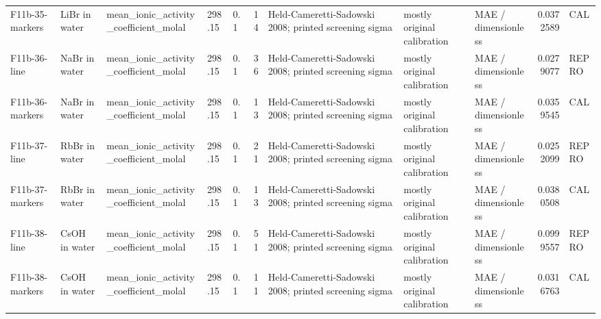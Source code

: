 \begin{landscape}
\begin{longtable}{L{1.9cm}L{2.5cm}L{2.1cm}L{1.6cm}L{1.6cm}rL{2.4cm}L{1.9cm}L{2.2cm}rL{1cm}}
F11b-\allowbreak{}35-\allowbreak{}markers & LiBr in water & mean\_\allowbreak{}ionic\_\allowbreak{}activity\_\allowbreak{}coefficient\_\allowbreak{}molal & 298.15 & 0.1 & 14 & Held-\allowbreak{}Cameretti-\allowbreak{}Sadowski 2008; printed screening sigma & mostly original calibration & MAE /\allowbreak{} dimensionless & 0.0372589 & CAL \\
F11b-\allowbreak{}36-\allowbreak{}line & NaBr in water & mean\_\allowbreak{}ionic\_\allowbreak{}activity\_\allowbreak{}coefficient\_\allowbreak{}molal & 298.15 & 0.1 & 36 & Held-\allowbreak{}Cameretti-\allowbreak{}Sadowski 2008; printed screening sigma & mostly original calibration & MAE /\allowbreak{} dimensionless & 0.0279077 & REPRO \\
F11b-\allowbreak{}36-\allowbreak{}markers & NaBr in water & mean\_\allowbreak{}ionic\_\allowbreak{}activity\_\allowbreak{}coefficient\_\allowbreak{}molal & 298.15 & 0.1 & 13 & Held-\allowbreak{}Cameretti-\allowbreak{}Sadowski 2008; printed screening sigma & mostly original calibration & MAE /\allowbreak{} dimensionless & 0.0359545 & CAL \\
F11b-\allowbreak{}37-\allowbreak{}line & RbBr in water & mean\_\allowbreak{}ionic\_\allowbreak{}activity\_\allowbreak{}coefficient\_\allowbreak{}molal & 298.15 & 0.1 & 21 & Held-\allowbreak{}Cameretti-\allowbreak{}Sadowski 2008; printed screening sigma & mostly original calibration & MAE /\allowbreak{} dimensionless & 0.0252099 & REPRO \\
F11b-\allowbreak{}37-\allowbreak{}markers & RbBr in water & mean\_\allowbreak{}ionic\_\allowbreak{}activity\_\allowbreak{}coefficient\_\allowbreak{}molal & 298.15 & 0.1 & 13 & Held-\allowbreak{}Cameretti-\allowbreak{}Sadowski 2008; printed screening sigma & mostly original calibration & MAE /\allowbreak{} dimensionless & 0.0380508 & CAL \\
F11b-\allowbreak{}38-\allowbreak{}line & CsOH in water & mean\_\allowbreak{}ionic\_\allowbreak{}activity\_\allowbreak{}coefficient\_\allowbreak{}molal & 298.15 & 0.1 & 51 & Held-\allowbreak{}Cameretti-\allowbreak{}Sadowski 2008; printed screening sigma & mostly original calibration & MAE /\allowbreak{} dimensionless & 0.0999557 & REPRO \\
F11b-\allowbreak{}38-\allowbreak{}markers & CsOH in water & mean\_\allowbreak{}ionic\_\allowbreak{}activity\_\allowbreak{}coefficient\_\allowbreak{}molal & 298.15 & 0.1 & 11 & Held-\allowbreak{}Cameretti-\allowbreak{}Sadowski 2008; printed screening sigma & mostly original calibration & MAE /\allowbreak{} dimensionless & 0.0316763 & CAL \\

\end{longtable}
\end{landscape}

